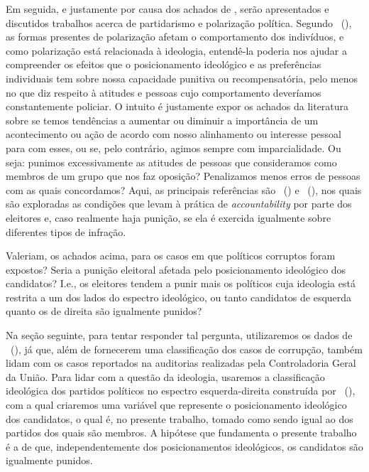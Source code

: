 \documentclass[
	12pt,				%
	openright,			%
	twoside,			%
	a4paper,			%
	openany,
	english,			%
	brazil				%
	]{abntex2}
\begin{document}
Em seguida, e justamente por causa dos achados de \cite{dunning2019voter}, serão apresentados e discutidos trabalhos acerca de partidarismo e polarização política. Segundo ~(\citeyear{Bednar2021Dec}), as formas presentes de polarização afetam o comportamento dos indivíduos, e como polarização está relacionada à ideologia, entendê-la poderia nos ajudar a compreender os efeitos que o posicionamento ideológico e as preferências individuais tem sobre nossa capacidade punitiva ou recompensatória, pelo menos no que diz respeito à atitudes e pessoas cujo comportamento deveríamos constantemente policiar. O intuito é justamente expor os achados da literatura sobre se temos tendências a aumentar ou diminuir a importância de um acontecimento ou ação de acordo com nosso alinhamento ou interesse pessoal para com esses, ou se, pelo contrário, agimos sempre com imparcialidade. Ou seja: punimos excessivamente as atitudes de pessoas que consideramos como membros de um grupo que nos faz oposição? Penalizamos menos erros de pessoas com as quais concordamos? Aqui, as principais referências são ~(\citeyear{Boas2019Apr}) e ~(\citeyear{Botero2021Apr}), nos quais são exploradas as condições que levam à prática de \textit{accountability} por parte dos eleitores e, caso realmente haja punição, se ela é exercida igualmente sobre diferentes tipos de infração.


Valeriam, os achados acima, para os casos em que políticos corruptos foram expostos? Seria a punição eleitoral afetada pelo posicionamento ideológico dos candidatos? I.e., os eleitores tendem a punir mais os políticos cuja ideologia está restrita a um dos lados do espectro ideológico, ou tanto candidatos de esquerda quanto os de direita são igualmente punidos?

Na seção seguinte, para tentar responder tal pergunta, utilizaremos os dados de ~(\citeyear{Brollo2013Aug}), já que, além de fornecerem uma classificação dos casos de corrupção, também lidam com os casos reportados na auditorias realizadas pela Controladoria Geral da União. Para lidar com a questão da ideologia, usaremos a classificação ideológica dos partidos políticos no espectro esquerda-direita construída por ~(\citeyear{Bolognesi2022Sep}), com a qual criaremos uma variável que represente o posicionamento ideológico dos candidatos, o qual é, no presente trabalho, tomado como sendo igual ao dos partidos dos quais são membros. A hipótese que fundamenta o presente trabalho é a de que, independentemente dos posicionamentos ideológicos, os candidatos são igualmente punidos.
\end{document}
